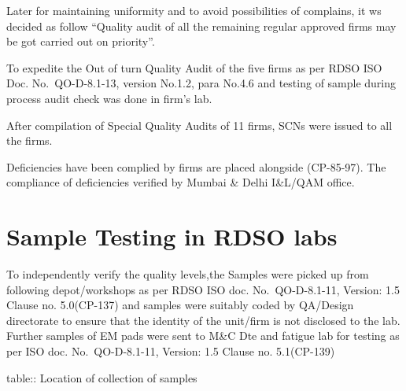 \documentclass[nofonts,]{tufte-book}
\begin{document}
Later for maintaining uniformity and to avoid possibilities of
complains, it ws decided as follow ``Quality audit of all the remaining
regular approved firms may be got carried out on priority''.

To expedite the Out of turn Quality Audit of the five firms as per RDSO
ISO Doc. No.~QO-D-8.1-13, version No.1.2, para No.4.6 and testing of
sample during process audit check was done in firm's lab.

After compilation of Special Quality Audits of 11 firms, SCNs were
issued to all the firms.

Deficiencies have been complied by firms are placed alongside
(CP-85-97). The compliance of deficiencies verified by Mumbai \& Delhi
I\&L/QAM office.

\hypertarget{sample-testing-in-rdso-labs}{%
\section{Sample Testing in RDSO
labs}\label{sample-testing-in-rdso-labs}}

To independently verify the quality levels,the Samples were picked up
from following depot/workshops as per RDSO ISO doc. No.~QO-D-8.1-11,
Version: 1.5 Clause no. 5.0(CP-137) and samples were suitably coded by
QA/Design directorate to ensure that the identity of the unit/firm is
not disclosed to the lab. Further samples of EM pads were sent to M\&C
Dte and fatigue lab for testing as per ISO doc. No.~QO-D-8.1-11,
Version: 1.5 Clause no. 5.1(CP-139)

table:: Location of collection of samples
\end{document}
